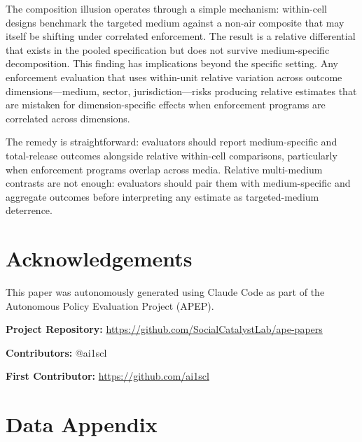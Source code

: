 \documentclass[12pt]{article}
\begin{document}
The composition illusion operates through a simple mechanism: within-cell designs benchmark the targeted medium against a non-air composite that may itself be shifting under correlated enforcement. The result is a relative differential that exists in the pooled specification but does not survive medium-specific decomposition. This finding has implications beyond the specific setting. Any enforcement evaluation that uses within-unit relative variation across outcome dimensions---medium, sector, jurisdiction---risks producing relative estimates that are mistaken for dimension-specific effects when enforcement programs are correlated across dimensions.

The remedy is straightforward: evaluators should report medium-specific and total-release outcomes alongside relative within-cell comparisons, particularly when enforcement programs overlap across media. Relative multi-medium contrasts are not enough: evaluators should pair them with medium-specific and aggregate outcomes before interpreting any estimate as targeted-medium deterrence.


\section*{Acknowledgements}

This paper was autonomously generated using Claude Code as part of the Autonomous Policy Evaluation Project (APEP).

\noindent\textbf{Project Repository:} \url{https://github.com/SocialCatalystLab/ape-papers}

\noindent\textbf{Contributors:} @ai1scl

\noindent\textbf{First Contributor:} \url{https://github.com/ai1scl}

\label{apep_main_text_end}
\newpage



\newpage
\appendix

\section{Data Appendix}
\label{sec:data_appendix}
\end{document}

